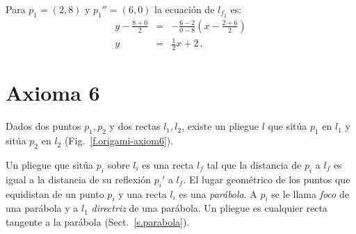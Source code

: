 \begin{example}
Para $p_1=(2,8)$ y $p_1''=(6,0)$ la ecuación de $l_{f_2}$ es:
\begin{eqnarray*}
y-\frac{8+0}{2}&=&-\frac{6-2}{0-8}\left(x-\frac{2+6}{2}\right)\\
y&=&\frac{1}{2}x+2\,.
\end{eqnarray*}
\end{example}


\section{Axioma 6}\label{s.ax6}
\begin{axiom}
Dados dos puntos $p_1,p_2$ y dos rectas $l_1,l_2$, existe un pliegue $l$ que sitúa $p_1$ en $l_1$ y sitúa $p_2$ en $l_2$ (Fig.~\ref{f.origami-axiom6}).
\end{axiom}

Un pliegue que sitúa $p_i$ sobre $l_i$ es una recta $l_f$ tal que la distancia de $p_i$ a $l_f$ es igual a la distancia de su reflexión $p_i'$ a $l_f$. El lugar geométrico de los puntos que equidistan de un punto $p_i$ y una recta $l_i$ es una \emph{parábola}. A $p_i$ se le llama \emph{foco} de una parábola y a $l_1$ \emph{directriz} de una parábola. Un pliegue es cualquier recta tangente a la parábola (Sect.~\ref{s.parabola}).

